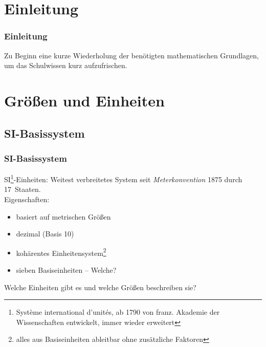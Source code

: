 

\subtitle{Technik Klasse E 01: \\
  Mathematische Grundlagen und Einheiten \\[2em]}
\date{Stand 18.09.2017}


\section{Einleitung}

\begin{frame}
  \frametitle{Einleitung}

  Zu Beginn eine kurze Wiederholung der benötigten mathematischen Grundlagen,
  um das Schulwissen kurz aufzufrischen.

\end{frame}

\section{Größen und Einheiten}

\subsection{SI-Basissystem}

\begin{frame}
  \frametitle{SI-Basissystem}

  SI\footnote{Système international d’unités, ab 1790 von franz. Akademie der
  Wissenschaften entwickelt, immer wieder erweitert}-Einheiten: Weitest
  verbreitetes System seit \emph{Meterkonvention} 1875 durch 17~Staaten.
  \\[1em]

  Eigenschaften:

  \begin{itemize}
    \item basiert auf metrischen Größen
    \item dezimal (Basis 10)
    \item kohärentes Einheitensystem\footnote{alles aus Basiseinheiten
      ableitbar ohne zusätzliche Faktoren}
    \item sieben Basiseinheiten -- Welche?
  \end{itemize}

  \bigskip \pause
  Welche Einheiten gibt es und welche Größen beschreiben sie?

\end{frame}

